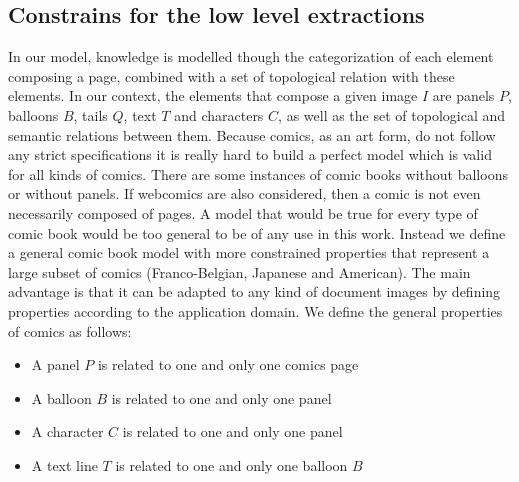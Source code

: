 




\subsection{Constrains for the low level extractions} %
\label{sec:kn:constrains_low_level_extraction}

In our model, knowledge is modelled though the categorization of each element composing a page, combined with a set of topological relation with these elements.
In our context, the elements that compose a given image $I$ are panels $P$, balloons $B$, tails $Q$, text $T$ and characters $C$, as well as the set of topological and semantic relations between them.
Because comics, as an art form, do not follow any strict specifications it is really hard to build a perfect model which is valid for all kinds of comics.
There are some instances of comic books without balloons or without panels.
If webcomics are also considered, then a comic is not even necessarily composed of pages.
A model that would be true for every type of comic book would be too general to be of any use in this work.
Instead we define a general comic book model with more constrained properties that represent a large subset of comics (Franco-Belgian, Japanese and American).
The main advantage is that it can be adapted to any kind of document images by defining properties according to the application domain.
We define the general properties of comics as follows:

\begin{itemize}
  \item A panel $P$ is related to one and only one comics page
  \item A balloon $B$ is related to one and only one panel
  \item A character $C$ is related to one and only one panel
  \item A text line $T$ is related to one and only one balloon $B$
\end{itemize}

